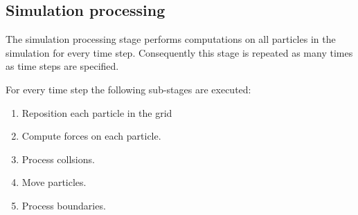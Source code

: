 \subsection{Simulation processing}

The simulation processing stage performs computations on all particles in the
simulation for every time step. Consequently this stage is repeated as many
times as time steps are specified.

For every time step the following sub-stages are executed:

\begin{enumerate}

\item Reposition each particle in the grid
\item Compute forces on each particle.
\item Process collsions.
\item Move particles.
\item Process boundaries.

\end{enumerate}






